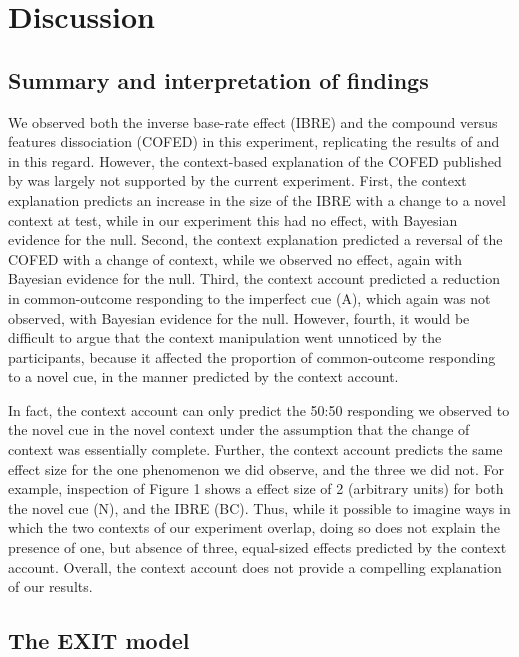 \documentclass[twocolumn]{article}
\begin{document}
{\section{Discussion}

\subsection{Summary and interpretation of findings}

We observed both the inverse base-rate effect (IBRE) and the compound versus features dissociation (COFED) in this experiment, replicating the results of \cite{Wills2014} and \cite[Exp.~3]{Inkster2019} in this regard. However, the context-based explanation of the COFED published by \cite{LePelley2016} was largely not supported by the current experiment. First, the context explanation predicts an increase in the size of the IBRE with a change to a novel context at test, while in our experiment this had no effect, with Bayesian evidence for the null. Second, the context explanation predicted a reversal of the COFED with a change of context, while we observed no effect, again with Bayesian evidence for the null. Third, the context account predicted a reduction in common-outcome responding to the imperfect cue (A), which again was not observed, with Bayesian evidence for the null. However, fourth, it would be difficult to argue that the context manipulation went unnoticed by the participants, because it affected the proportion of common-outcome responding to a novel cue, in the manner predicted by the context account.

In fact, the context account can only predict the 50:50 responding we observed to the novel cue in the novel context  under the assumption that the change of context was essentially complete. Further, the context account predicts the same effect size for the one phenomenon we did observe, and the three we did not. For example, inspection of Figure 1 shows a effect size of 2 (arbitrary units) for both the novel cue (N), and the IBRE (BC). Thus, while it possible to imagine ways in which the two contexts of our experiment overlap, doing so does not explain the presence of one, but absence of three, equal-sized effects predicted by the context account. Overall, the context account does not provide a compelling explanation of our results.

\subsection{The EXIT model}

}
\end{document}
